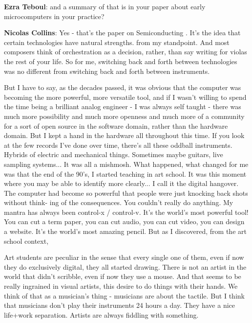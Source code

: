 \textbf{Ezra Teboul}: and a summary of that is in your paper about early microcomputers in your practice?
					
\textbf{Nicolas Collins}: Yes - that’s the paper on Semiconducting \citep{collins2012}. It’s the idea that certain technologies have natural strengths. from my standpoint. And most composers think of orchestration as a decision, rather, than say writing for violas the rest of your life. So for me, switching back and forth between technologies was no different from switching back and forth between instruments.
					
But I have to say, as the decades passed, it was obvious that the computer was becoming the more powerful, more versatile tool, and if I wasn’t willing to spend the time being a brilliant analog engineer - I was always self taught - there was much more possibility and much more openness and much more of a community for a sort of open source in the software domain, rather than the hardware domain. But I kept a hand in the hardware all throughout this time. If you look at the few records I’ve done over time, there’s all these oddball instruments. Hybrids of electric and mechanical things. Sometimes maybe guitars, live sampling systems... It was all a mishmosh. What happened, what changed for me was that the end of the 90’s, I started teaching in art school. It was this moment where you may be able to identify more clearly... I call it the digital hangover. The computer had become so powerful that people were just knocking back shots without think- ing of the consequences. You couldn’t really do anything. My mantra has always been control-x / control-v. It’s the world’s most powerful tool! You can cut a term paper, you can cut audio, you can cut video, you can design a website. It’s the world’s most amazing pencil. But as I discovered, from the art school context,
									
Art students are peculiar in the sense that every single one of them, even if now they do exclusively digital, they all started drawing. There is not an artist in the world that didn’t scribble, even if now they use a mouse. And that seems to be really ingrained in visual artists, this desire to do things with their hands. We think of that as a musician’s thing - musicians are about the tactile. But I think that musicians don’t play their instruments 24 hours a day. They have a nice life+work separation. Artists are always fiddling with something.
					
